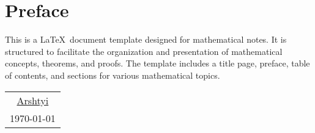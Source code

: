 \section*{Preface}
This is a \LaTeX\ document template designed for mathematical notes. It is structured to facilitate the organization and presentation of mathematical concepts, theorems, and proofs. The template includes a title page, preface, table of contents, and sections for various mathematical topics.
\begin{flushright}
    \begin{tabular}{c}
        \href{https://github.com/Arshtyi}{Arshtyi} \\
        \today                                     \\
    \end{tabular}
\end{flushright}
\thispagestyle{empty}